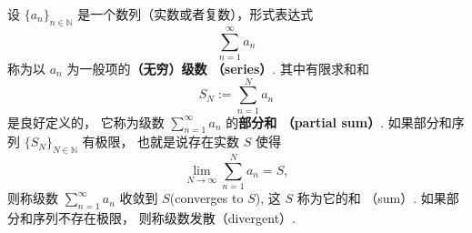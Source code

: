 


设 $\{a_n\}_{n\in\mathbb{N}}$ 是一个数列（实数或者复数），形式表达式
\[
\sum_{n=1}^\infty a_n
\]
称为以 $a_n$ 为一般项的\textbf{（无穷）级数 （series）}. 其中有限求和和
\[
S_N:=\sum_{n=1}^N a_n
\]
是良好定义的， 它称为级数 $\sum_{n=1}^\infty a_n$ 的\textbf{部分和 （partial sum）}. 如果部分和序列 $\{S_N\}_{N\in\mathbb{N}}$ 有极限， 也就是说存在实数 $S$ 使得
\[
\lim_{N\to\infty}\sum_{n=1}^N a_n=S,
\] 
则称级数 $\sum_{n=1}^\infty a_n$ 收敛到 $S$(converges to $S$), 这 $S$ 称为它的和 （sum）. 如果部分和序列不存在极限， 则称级数发散（divergent）. 

